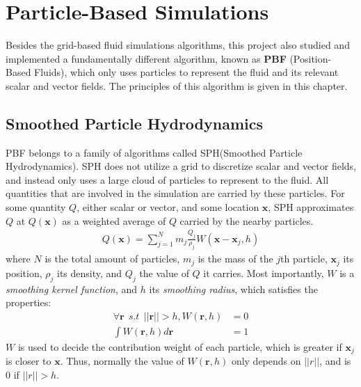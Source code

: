\chapter{Particle-Based Simulations}
\label{chapter particle}



Besides the grid-based fluid simulations algorithms, this project also studied and implemented a fundamentally different algorithm, known as \textbf{PBF} (Position-Based Fluids), which only uses particles to represent the fluid and its relevant scalar and vector fields. The principles of this algorithm is given in this chapter.


\section{Smoothed Particle Hydrodynamics}
PBF belongs to a family of algorithms called SPH(Smoothed Particle Hydrodynamics). SPH does not utilize a grid to discretize scalar and vector fields, and instead only uses a large cloud of particles to represent to the fluid. All quantities that are involved in the simulation are carried by these particles. For some quantity $Q$, either scalar or vector, and some location $\textbf{x}$, SPH approximates $Q$ at $Q(\textbf{x})$ as a weighted average of $Q$ carried by the nearby particles.
\begin{equation}
    \label{eqn SPH basic}
    \begin{aligned}
        Q(\textbf{x}) = \sum_{j=1}^N m_j \frac{Q_j}{\rho_j} W(\textbf{x}-\textbf{x}_j,h)
    \end{aligned}
\end{equation}
where $N$ is the total amount of particles, $m_j$ is the mass of the $j$th particle, $\textbf{x}_j$ its position, $\rho_j$ its density, and $Q_j$ the value of $Q$ it carries. Most importantly, $W$ is a \textit{smoothing kernel function}, and $h$ its \textit{smoothing radius}, which satisfies the properties:
\begin{equation}
    \begin{aligned}
        \forall\textbf{r}~~s.t~~||\textbf{r}||>h, W(\textbf{r},h) &= 0\\
        \int W(\textbf{r},h) d\textbf{r} &= 1
    \end{aligned}
\end{equation}
$W$ is used to decide the contribution weight of each particle, which is greater if $\textbf{x}_j$ is closer to $\textbf{x}$. Thus, normally the value of $W(\textbf{r},h)$ only depends on $||r||$, and is $0$ if $||r||>h$.


